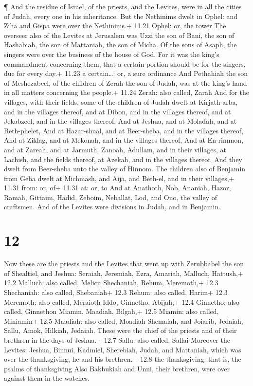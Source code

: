  ¶ And the residue of Israel, of the priests, and the
Levites, were in all the cities of Judah, every one in his inheritance.
 But the Nethinims dwelt in Ophel: and Ziha and Gispa were
over the Nethinims.+ 11.21 Ophel: or, the tower  The
overseer also of the Levites at Jerusalem was Uzzi the son of Bani, the
son of Hashabiah, the son of Mattaniah, the son of Micha. Of the sons of
Asaph, the singers were over the business of the house of God.
 For it was the king's commandment concerning them, that a
certain portion should be for the singers, due for every day.+ 11.23 a
certain\ldots: or, a sure ordinance  And Pethahiah the son
of Meshezabeel, of the children of Zerah the son of Judah, was at the
king's hand in all matters concerning the people.+ 11.24 Zerah: also
called, Zarah  And for the villages, with their fields,
some of the children of Judah dwelt at Kirjath-arba, and in the villages
thereof, and at Dibon, and in the villages thereof, and at Jekabzeel,
and in the villages thereof,  And at Jeshua, and at
Moladah, and at Beth-phelet,  And at Hazar-shual, and at
Beer-sheba, and in the villages thereof,  And at Ziklag,
and at Mekonah, and in the villages thereof,  And at
En-rimmon, and at Zareah, and at Jarmuth,  Zanoah, Adullam,
and in their villages, at Lachish, and the fields thereof, at Azekah,
and in the villages thereof. And they dwelt from Beer-sheba unto the
valley of Hinnom.  The children also of Benjamin from Geba
dwelt at Michmash, and Aija, and Beth-el, and in their villages,+ 11.31
from: or, of+ 11.31 at: or, to  And at Anathoth, Nob,
Ananiah,  Hazor, Ramah, Gittaim,  Hadid,
Zeboim, Neballat,  Lod, and Ono, the valley of craftsmen.
 And of the Levites were divisions in Judah, and in
Benjamin.

\hypertarget{section-11}{%
\section{12}\label{section-11}}

 Now these are the priests and the Levites that went up with
Zerubbabel the son of Shealtiel, and Jeshua: Seraiah, Jeremiah, Ezra,
 Amariah, Malluch, Hattush,+ 12.2 Malluch: also called,
Melicu  Shechaniah, Rehum, Meremoth,+ 12.3 Shechaniah: also
called, Shebaniah+ 12.3 Rehum: also called, Harim+ 12.3 Meremoth: also
called, Meraioth  Iddo, Ginnetho, Abijah,+ 12.4 Ginnetho:
also called, Ginnethon  Miamin, Maadiah, Bilgah,+ 12.5
Miamin: also called, Miniamin+ 12.5 Maadiah: also called, Moadiah
 Shemaiah, and Joiarib, Jedaiah,  Sallu, Amok,
Hilkiah, Jedaiah. These were the chief of the priests and of their
brethren in the days of Jeshua.+ 12.7 Sallu: also called, Sallai
 Moreover the Levites: Jeshua, Binnui, Kadmiel, Sherebiah,
Judah, and Mattaniah, which was over the thanksgiving, he and his
brethren.+ 12.8 the thanksgiving: that is, the psalms of thanksgiving
 Also Bakbukiah and Unni, their brethren, were over against
them in the watches.

